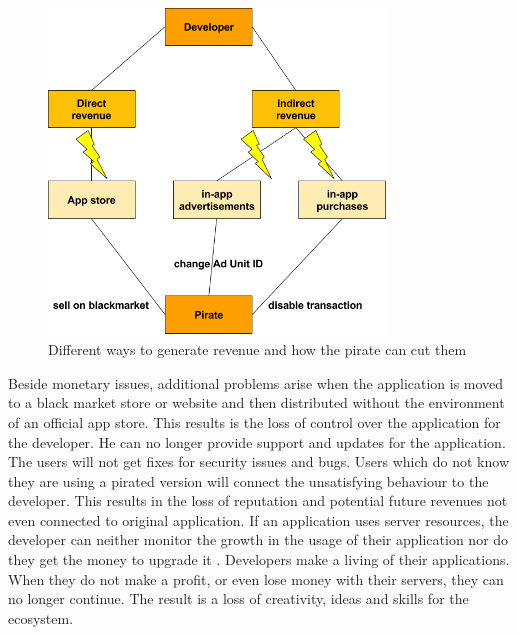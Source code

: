 \begin{figure}[h]
    \centering
    \includegraphics[width=0.8\textwidth]{data/revenue.png}
    \caption{Different ways to generate revenue and how the pirate can cut them}
    \label{fig:revenue}
\end{figure}
Beside monetary issues, additional problems arise when the application is moved to a black market store or website and then distributed without the environment of an official app store.
This results is the loss of control over the application for the developer.
He can no longer provide support and updates for the application.
The users will not get fixes for security issues and bugs.
Users which do not know they are using a pirated version will connect the unsatisfying behaviour to the developer.
This results in the loss of reputation and potential future revenues not even connected to original application.
\newline
If an application uses server resources, the developer can neither monitor the growth in the usage of their application nor do they get the money to upgrade it \cite{lierschDeveloperThreats}.
\newline
Developers make a living of their applications.
When they do not make a profit, or even lose money with their servers, they can no longer continue.
The result is a loss of creativity, ideas and skills for the ecosystem.
